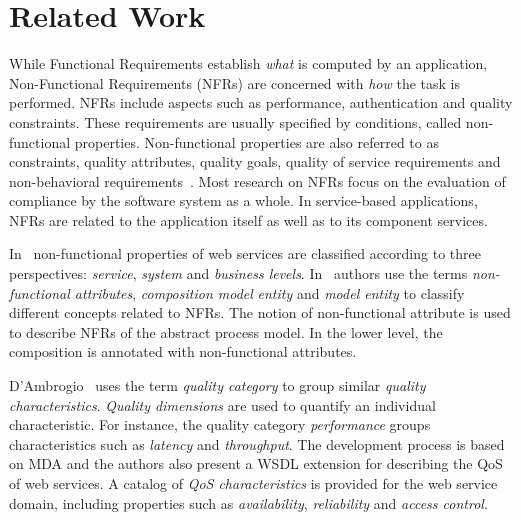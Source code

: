 \documentclass{singlecol-new}
\theoremstyle{TH}{
\newtheorem{lemma}{Lemma}
\newtheorem{theorem}[lemma]{Theorem}
\newtheorem{corrolary}[lemma]{Corrolary}
\newtheorem{conjecture}[lemma]{Conjecture}
\newtheorem{proposition}[lemma]{Proposition}
\newtheorem{claim}[lemma]{Claim}
\newtheorem{stheorem}[lemma]{Wrong Theorem}
\newtheorem{algorithm}{Algorithm}
}
\theoremstyle{THrm}{
\newtheorem{definition}{Definition}[section]
\newtheorem{question}{Question}[section]
\newtheorem{remark}{Remark}
\newtheorem{scheme}{Scheme}
}
\theoremstyle{THhit}{
\newtheorem{case}{Case}[section]
}
\theoremstyle{THhsl}{
\newtheorem{example}{Example}
}
\begin{document}
\section{Related Work}
\label{sec:relworks}

While Functional Requirements establish \textit{what} is computed by an application, Non-Functional Requirements (NFRs) are concerned with \textit{how} the task is performed.
NFRs include aspects such as performance, authentication and quality constraints.
These requirements are usually specified by conditions, called non-functional properties.
Non-functional properties are also referred to as constraints, quality attributes, quality goals, quality of service requirements and non-behavioral requirements~\cite{Chung91,MylopoulosBook99,Chung2009}.
%
Most research  on NFRs focus on the evaluation of compliance by the software system as a whole. %
In service-based applications, NFRs are related to the application itself as well as to  its component services.

In~\cite{Babamir2010,Yeom2006} non-functional properties of web services are classified according to three perspectives:
\textit{service}, \textit{system} and \textit{business levels}.
In~\cite{XiaoCZBOLH08}  authors use the terms
\textit{non-functional attributes}, \textit{composition mo\-del}  \textit{entity} and \textit{mo\-del entity}  to classify different concepts related to NFRs.
The notion of non-functional attribute is used to describe NFRs of the abstract process model.
In the lower level, the composition is annotated with non-functional attributes.

D'Ambrogio~\cite{DAmbrogio06} uses the term \textit{quality category} to group similar \textit{quality characteristics}.
\textit{Quality dimensions} are used to quantify an individual characteristic.
For instance, the quality category \textit{performance} groups characteristics such as
\textit{latency} and \textit{throughput}.
The development process is based on MDA and the authors also present a WSDL extension for describing the QoS of web services. A catalog of \textit{QoS characteristics} is provided for the web service domain, including properties such as \textit{availability}, \textit{reliability} and \textit{access control}.
\end{document}
